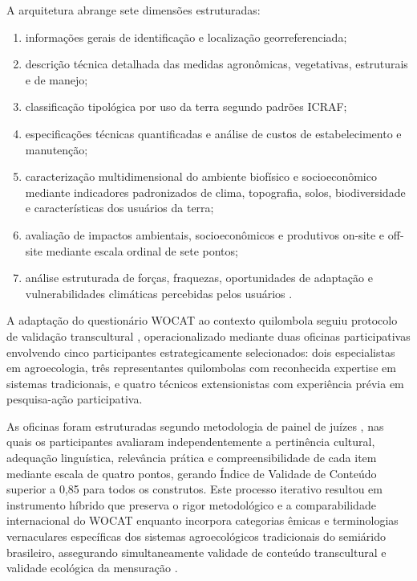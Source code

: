 A arquitetura abrange sete dimensões estruturadas:

\begin{enumerate}[itemsep=0pt,parsep=0pt,topsep=0pt]
\item informações gerais de identificação e localização georreferenciada;
\item descrição técnica detalhada das medidas agronômicas, vegetativas, estruturais e de manejo;
\item classificação tipológica por uso da terra segundo padrões ICRAF;
\item especificações técnicas quantificadas e análise de custos de estabelecimento e manutenção;
\item caracterização multidimensional do ambiente biofísico e socioeconômico mediante indicadores padronizados de clima, topografia, solos, biodiversidade e características dos usuários da terra;
\item avaliação de impactos ambientais, socioeconômicos e produtivos on-site e off-site mediante escala ordinal de sete pontos;
\item análise estruturada de forças, fraquezas, oportunidades de adaptação e vulnerabilidades climáticas percebidas pelos usuários \cite{Liniger2011}.
\end{enumerate} 

A adaptação do questionário WOCAT ao contexto quilombola seguiu protocolo de validação transcultural \cite{Beaton2000}, operacionalizado mediante duas oficinas participativas envolvendo cinco participantes estrategicamente selecionados: dois especialistas em agroecologia, três representantes quilombolas com reconhecida expertise em sistemas tradicionais, e quatro técnicos extensionistas com experiência prévia em pesquisa-ação participativa. 

As oficinas foram estruturadas segundo metodologia de painel de juízes \cite{Alexandre2011}, nas quais os participantes avaliaram independentemente a pertinência cultural, adequação linguística, relevância prática e compreensibilidade de cada item mediante escala de quatro pontos, gerando Índice de Validade de Conteúdo superior a 0,85 para todos os construtos. Este processo iterativo resultou em instrumento híbrido que preserva o rigor metodológico e a comparabilidade internacional do WOCAT enquanto incorpora categorias êmicas \cite{Pike1967} e terminologias vernaculares específicas dos sistemas agroecológicos tradicionais do semiárido brasileiro, assegurando simultaneamente validade de conteúdo transcultural \cite{Milfont2010} e validade ecológica da mensuração \cite{Bronfenbrenner1979}.

